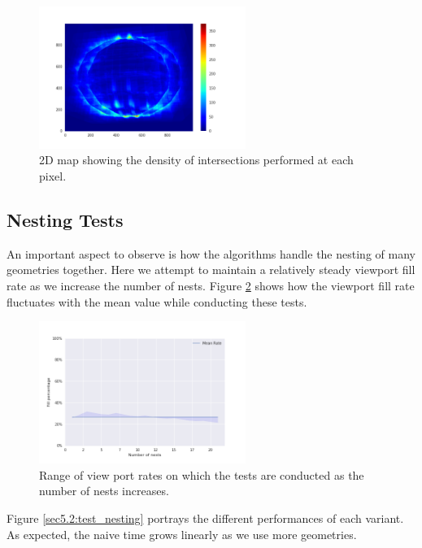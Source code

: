 \documentclass[a4paper,11pt,oneside]{article}
\begin{document}
\begin{figure}[H]
	\centering
	\includegraphics[width=0.6\textwidth]{section5/plots/test_count_density_optim.png}
	\caption{2D map showing the density of intersections performed at each pixel.}
	\label{sec5.1:test_count_density_optim}
\end{figure}


\subsection{Nesting Tests}

An important aspect to observe is how the algorithms handle the nesting of many geometries together. Here we attempt to maintain a relatively steady viewport fill rate as we increase the number of nests. Figure \ref{sec5.2:test_nesting_rates} shows how the viewport fill rate fluctuates with the mean value while conducting these tests.

\begin{figure}[H]
	\centering
	\includegraphics[width=0.6\textwidth]{section5/plots/test_nesting_rates.png}
	\caption{Range of view port rates on which the tests are conducted as the number of nests increases.}
	\label{sec5.2:test_nesting_rates}
\end{figure}


Figure \ref{sec5.2:test_nesting} portrays the different performances of each variant. As expected, the naive time grows linearly as we use more geometries.  
\end{document}
